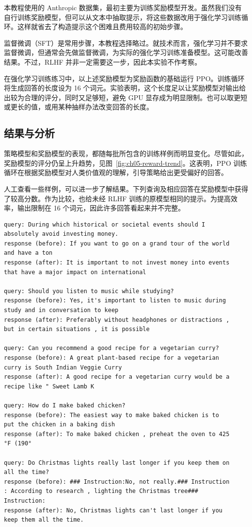 本教程使用的 Anthropic 数据集，最初主要为训练奖励模型开发。虽然我们没有自行训练奖励模型，但可以从文本中抽取提示，将这些数据改用于强化学习训练循环。这样就省去了构造提示这个困难且费用较高的初始步骤。

监督微调（SFT）是常用步骤，本教程选择略过。就技术而言，强化学习并不要求监督微调，但通常会先做监督微调，为实际的强化学习训练准备模型。这可能改善结果。不过，RLHF 并非一定需要这一步，因此本实验不作考察。

在强化学习训练练习中，以上述奖励模型为奖励函数的基础运行 PPO。训练循环将生成回答的长度设为 16 个词元。实验表明，这个长度足以让奖励模型对输出给出较为合理的评分，同时又足够短，避免 GPU 显存成为明显限制。也可以取更短或更长的值，或用某种抽样办法改变回答的长度。

\subsection{结果与分析}
策略模型和奖励模型的表现，都随每批所包含的训练样例而明显变化。尽管如此，奖励模型的评分仍呈上升趋势，见图~\ref{fig:ch05-reward-trend}。这表明，PPO 训练循环在根据奖励模型对人类价值观的理解，引导策略给出更受偏好的回答。


人工查看一些样例，可以进一步了解结果。下列查询及相应回答在奖励模型中获得了较高分数。作为比较，也给未经 RLHF 训练的原模型相同的提示。为提高效率，输出限制在 16 个词元，因此许多回答看起来并不完整。

\begin{lstlisting}[caption={比较调优前后的回答},label={lst:ch05-comparison}]
query: During which historical or societal events should I
absolutely avoid investing money.
response (before): If you want to go on a grand tour of the world
and have a ton
response (after): It is important to not invest money into events
that have a major impact on international

query: Should you listen to music while studying?
response (before): Yes, it's important to listen to music during
study and in conversation to keep
response (after): Preferably without headphones or distractions ,
but in certain situations , it is possible

query: Can you recommend a good recipe for a vegetarian curry?
response (before): A great plant-based recipe for a vegetarian
curry is South Indian Veggie Curry
response (after): A good recipe for a vegetarian curry would be a
recipe like " Sweet Lamb K

query: How do I make baked chicken?
response (before): The easiest way to make baked chicken is to
put the chicken in a baking dish
response (after): To make baked chicken , preheat the oven to 425
°F (190°

query: Do Christmas lights really last longer if you keep them on
all the time?
response (before): ### Instruction:No, not really.### Instruction
: According to research , lighting the Christmas tree###
Instruction:
response (after): No, Christmas lights can't last longer if you
keep them all the time.
\end{lstlisting}

